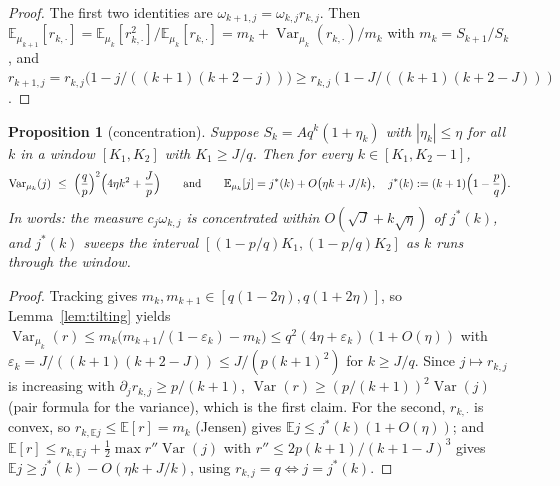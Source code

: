 \documentclass[11pt]{article}
\newtheorem{proposition}[theorem]{Proposition}
\theoremstyle{definition}
\begin{document}
\begin{proof}
  The first two identities are $\omega_{k+1,j}=\omega_{k,j}r_{k,j}$.
  Then $\mathbb E_{\mu_{k+1}}[r_{k,\cdot}]=\mathbb E_{\mu_k}[r_{k,\cdot}^2]/\mathbb E_{\mu_k}[r_{k,\cdot}]
  =m_k+\operatorname{Var}_{\mu_k}(r_{k,\cdot})/m_k$ with $m_k=S_{k+1}/S_k$,
  and $r_{k+1,j}=r_{k,j}\bigl(1-j/((k+1)(k+2-j))\bigr)\ge r_{k,j}(1-J/((k+1)(k+2-J)))$.
\end{proof}

\begin{proposition}[concentration]\label{prop:concentration}
  Suppose $S_k=Aq^k(1+\eta_k)$ with $|\eta_k|\le\eta$ for all $k$ in a
  window $[K_1,K_2]$ with $K_1\ge J/q$.  Then for every $k\in[K_1,K_2-1]$,
  \[
    \operatorname{Var}_{\mu_k}(j)\ \le\ \Bigl(\frac qp\Bigr)^{2}\Bigl(4\eta k^2+\frac{J}{p}\Bigr)
    \qquad\text{and}\qquad
    \mathbb E_{\mu_k}[j]=j^*(k)+O\bigl(\eta k+J/k\bigr),
    \quad j^*(k):=(k+1)\Bigl(1-\frac pq\Bigr).
  \]
  In words: the measure $c_j\omega_{k,j}$ is concentrated within
  $O(\sqrt{J}+k\sqrt\eta)$ of $j^*(k)$, and $j^*(k)$ sweeps the interval
  $[(1-p/q)K_1,(1-p/q)K_2]$ as $k$ runs through the window.
\end{proposition}

\begin{proof}
  Tracking gives $m_k,m_{k+1}\in[q(1-2\eta),q(1+2\eta)]$, so
  Lemma~\ref{lem:tilting} yields
  $\operatorname{Var}_{\mu_k}(r)\le m_k\bigl(m_{k+1}/(1-\varepsilon_k)-m_k\bigr)
  \le q^2(4\eta+\varepsilon_k)(1+O(\eta))$ with
  $\varepsilon_k=J/((k+1)(k+2-J))\le J/(p(k+1)^2)$ for $k\ge J/q$.
  Since $j\mapsto r_{k,j}$ is increasing with $\partial_jr_{k,j}\ge p/(k+1)$,
  $\operatorname{Var}(r)\ge(p/(k+1))^2\operatorname{Var}(j)$ (pair formula for the
  variance), which is the first claim.  For the second, $r_{k,\cdot}$
  is convex, so $r_{k,\mathbb E j}\le\mathbb E[r]=m_k$ (Jensen) gives
  $\mathbb Ej\le j^*(k)(1+O(\eta))$; and
  $\mathbb E[r]\le r_{k,\mathbb Ej}+\tfrac12\max r''\operatorname{Var}(j)$ with
  $r''\le2p(k+1)/(k+1-J)^3$ gives $\mathbb Ej\ge j^*(k)-O(\eta k+J/k)$,
  using $r_{k,j}=q\iff j=j^*(k)$.
\end{proof}
\end{document}
